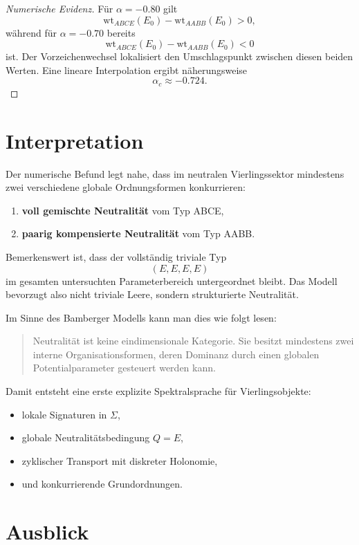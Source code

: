 \documentclass[11pt,a4paper]{article}
\newcommand{\wt}{\mathrm{wt}}
\begin{document}
	\begin{proof}[Numerische Evidenz]
		Für \(\alpha=-0.80\) gilt
		\[
		\wt_{ABCE}(E_0)-\wt_{AABB}(E_0)>0,
		\]
		während für \(\alpha=-0.70\) bereits
		\[
		\wt_{ABCE}(E_0)-\wt_{AABB}(E_0)<0
		\]
		ist. Der Vorzeichenwechsel lokalisiert den Umschlagspunkt zwischen diesen beiden Werten. Eine lineare Interpolation ergibt näherungsweise
		\[
		\alpha_c\approx -0.724.
		\]
	\end{proof}
	
	\section{Interpretation}
	
	Der numerische Befund legt nahe, dass im neutralen Vierlingssektor mindestens zwei verschiedene globale Ordnungsformen konkurrieren:
	\begin{enumerate}[label=(\roman*)]
		\item \textbf{voll gemischte Neutralität} vom Typ ABCE,
		\item \textbf{paarig kompensierte Neutralität} vom Typ AABB.
	\end{enumerate}
	
	Bemerkenswert ist, dass der vollständig triviale Typ
	\[
	(E,E,E,E)
	\]
	im gesamten untersuchten Parameterbereich untergeordnet bleibt. Das Modell bevorzugt also nicht triviale Leere, sondern strukturierte Neutralität.
	
	Im Sinne des Bamberger Modells kann man dies wie folgt lesen:
	\begin{quote}
		Neutralität ist keine eindimensionale Kategorie. Sie besitzt mindestens zwei interne Organisationsformen, deren Dominanz durch einen globalen Potentialparameter gesteuert werden kann.
	\end{quote}
	
	Damit entsteht eine erste explizite Spektralsprache für Vierlingsobjekte:
	\begin{itemize}
		\item lokale Signaturen in \(\Sigma\),
		\item globale Neutralitätsbedingung \(Q=E\),
		\item zyklischer Transport mit diskreter Holonomie,
		\item und konkurrierende Grundordnungen.
	\end{itemize}
	
	\section{Ausblick}
	
\end{document}
